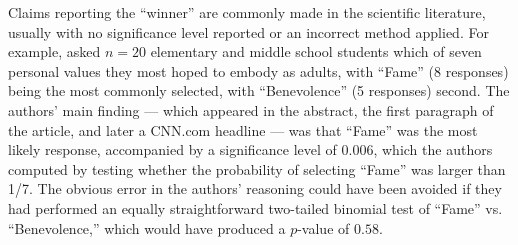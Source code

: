 \documentclass[11pt]{article}
\theoremstyle{definition}
\theoremstyle{custom}
\begin{document}
Claims reporting the ``winner'' are commonly made in the scientific literature, usually with no significance level reported or an incorrect method applied. For example, \citet{Uhls:2012gf} asked $n=20$ elementary and middle school students which of seven personal values they most hoped to embody as adults, with ``Fame'' (8 responses) being the most commonly selected, with ``Benevolence'' (5 responses) second. The authors' main finding --- which appeared in the abstract, the first paragraph of the article, and later a CNN.com headline \citep{alikhani} --- was that ``Fame'' was the most likely response, accompanied by a significance level of $0.006$, which the authors computed by testing whether the probability of selecting ``Fame'' was larger than 1/7. The obvious error in the authors' reasoning could have been avoided if they had performed an equally straightforward two-tailed binomial test of ``Fame'' vs. ``Benevolence,'' which would have produced a $p$-value of $0.58$.



\end{document}
